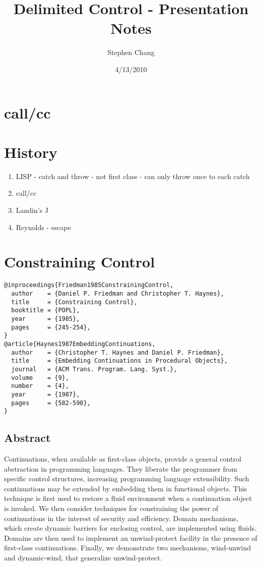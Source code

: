 \documentclass[letterpaper]{llncs}
\begin{document}

\title{Delimited Control - Presentation Notes}
\author{Stephen Chang}
\institute{}
\date{4/13/2010}
\maketitle

\section*{call/cc}


\section*{History}

\begin{enumerate}
	\item LISP - catch and throw - not first class - can only throw once to each catch
	\item call/cc
	\item Landin's J
	\item Reynolds - escape
\end{enumerate}

\section*{Constraining Control}%

\begin{verbatim}
@inproceedings{Friedman1985ConstrainingControl,
  author    = {Daniel P. Friedman and Christopher T. Haynes},
  title     = {Constraining Control},
  booktitle = {POPL},
  year      = {1985},
  pages     = {245-254},
}
@article{Haynes1987EmbeddingContinuations,
  author    = {Christopher T. Haynes and Daniel P. Friedman},
  title     = {Embedding Continuations in Procedural Objects},
  journal   = {ACM Trans. Program. Lang. Syst.},
  volume    = {9},
  number    = {4},
  year      = {1987},
  pages     = {582-598},
}
\end{verbatim}

\subsection*{Abstract}
Continuations, when available as first-class objects, provide a general control abstraction in programming languages. They liberate the programmer from specific control structures, increasing programming language extensibility. Such continuations may be extended by embedding them in functional objects. This technique is first used to restore a fluid environment when a continuation object is invoked. We then consider techniques for constraining the power of continuations in the interest of security and efficiency. Domain mechanisms, which create dynamic barriers for enclosing control, are implemented using fluids. Domains are then used to implement an unwind-protect facility in the presence of first-class continuations. Finally, we demonstrate two mechanisms, wind-unwind and dynamic-wind, that generalize unwind-protect.
\end{document}

